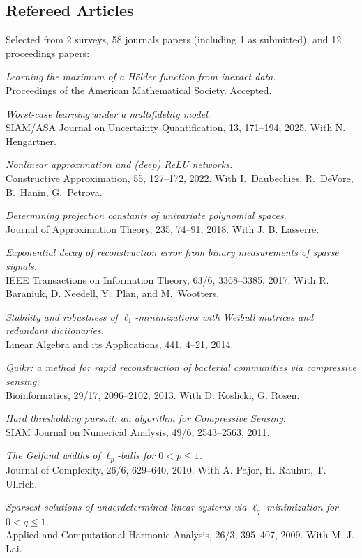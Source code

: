 \documentclass[11pt]{article}
\begin{document}
\subsection{Refereed Articles}
Selected from 2 surveys, 58 journals papers (including 1 as submitted), and 12 proceedings papers:
\betaremune
\item {\sl Learning the maximum of a H\"older function from inexact data}.\\
Proceedings of the American Mathematical Society.
Accepted.
\item {\sl Worst-case learning under a multifidelity model}.\\
SIAM/ASA Journal on Uncertainty Quantification, 13, 171--194, 2025. With N. Hengartner.
\item {\sl Nonlinear approximation and (deep) ReLU networks.}\\
Constructive Approximation,  55, 127--172, 2022.
With I.~Daubechies, R.~DeVore, B.~Hanin, G.~Petrova.
\item {\sl Determining projection constants of univariate polynomial spaces}.\\
Journal of Approximation Theory, 235, 74--91, 2018.
With J. B. Lasserre.
\item {\sl Exponential decay of reconstruction error from binary measurements of sparse signals.}\\
IEEE Transactions on Information Theory, 63/6, 3368--3385, 2017.
With R. Baraniuk, D. Needell, Y.~Plan, and \mbox{M.~Wootters}.
\item {\sl Stability and robustness of $\ell_1$-minimizations with Weibull matrices and redundant dictionaries.}\\
Linear Algebra and its Applications, 441, 4--21, 2014.
\item {\sl Quikr: a method for rapid reconstruction of bacterial communities via compressive sensing.}\\
Bioinformatics, 29/17, 2096--2102, 2013. 
With D. Koslicki, G. Rosen.
\item {\sl Hard thresholding pursuit: an algorithm for Compressive Sensing.}\\
SIAM Journal on Numerical Analysis, 49/6, 2543--2563, 2011.
\item {\sl The Gelfand widths of $\ell_p$-balls for $0<p \le 1$.}\\
Journal of Complexity, 26/6, 629--640, 2010. 
With A. Pajor, H. Rauhut, T. Ullrich.
\item {\sl  Sparsest solutions of underdetermined linear systems via $\ell_q$-minimization for $0 <  q  \le  1$.}\\
Applied and Computational Harmonic Analysis, 26/3, 395--407, 2009. 
With M.-J. Lai.
\eetaremune
\end{document}
